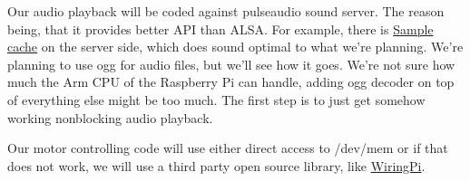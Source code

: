 \documentclass[english,11pt,twoside,a4paper]{article}
\begin{document}
Our audio playback will be coded against pulseaudio sound server. The reason being, that it provides better API than ALSA. For example, there is \href{http://freedesktop.org/software/pulseaudio/doxygen/scache.html}{Sample cache} on the server side, which does sound optimal to what we're planning. We're planning to use ogg for audio files, but we'll see how it goes. We're not sure how much the Arm CPU of the Raspberry Pi can handle, adding ogg decoder on top of everything else might be too much. The first step is to just get somehow working nonblocking audio playback.

Our motor controlling code will use either direct access to /dev/mem or if that does not work, we will use a third party open source library, like \href{http://wiringpi.com/}{WiringPi}.
\end{document}
